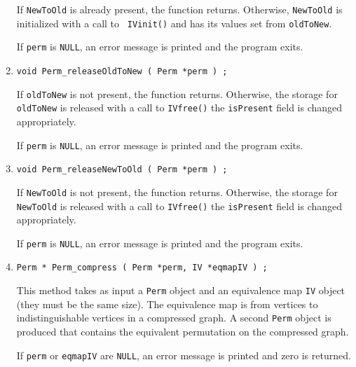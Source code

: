 \begin{enumerate}
\begin{verbatim}
\end{verbatim}
If {\tt NewToOld} is already present, the function returns.
Otherwise, {\tt NewToOld} is initialized with a call to {\tt
IVinit()} and has its values set from {\tt oldToNew}.
\par {}
If {\tt perm} is {\tt NULL}, 
an error message is printed and the program exits.
\item
\begin{verbatim}
void Perm_releaseOldToNew ( Perm *perm ) ;
\end{verbatim}
If {\tt oldToNew} is not present, the function returns.
Otherwise, the storage for {\tt oldToNew} is released with 
a call to {\tt IVfree()} the {\tt isPresent} field is changed
appropriately.
\par {}
If {\tt perm} is {\tt NULL}, 
an error message is printed and the program exits.
\item
\begin{verbatim}
void Perm_releaseNewToOld ( Perm *perm ) ;
\end{verbatim}
If {\tt NewToOld} is not present, the function returns.
Otherwise, the storage for {\tt NewToOld} is released with 
a call to {\tt IVfree()} the {\tt isPresent} field is changed
appropriately.
\par {}
If {\tt perm} is {\tt NULL}, 
an error message is printed and the program exits.
\item
\begin{verbatim}
Perm * Perm_compress ( Perm *perm, IV *eqmapIV ) ;
\end{verbatim}
This method takes as input a {\tt Perm} object 
and an equivalence map {\tt IV} object (they must be the same size).
The equivalence map is from vertices to indistinguishable vertices
in a compressed graph.
A second {\tt Perm} object is produced that contains the equivalent
permutation on the compressed graph.
\par {}
If {\tt perm} or {\tt eqmapIV} are {\tt NULL},
an error message is printed and zero is returned.
\end{enumerate}
\par
